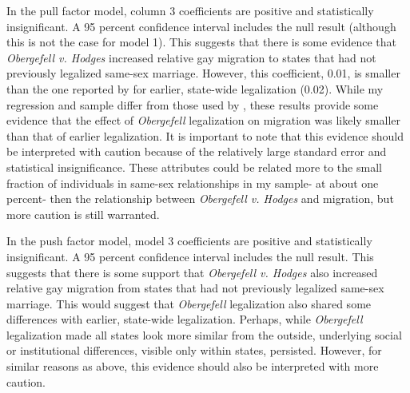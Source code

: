 \documentclass[12pt,letterpaper]{article}
\begin{document}
In the pull factor model, column 3 coefficients are positive and statistically insignificant. A 95 percent confidence interval includes the null result (although this is not the case for model 1). This suggests that there is some evidence that \textit{Obergefell v. Hodges} increased relative gay migration to states that had not previously legalized same-sex marriage. However, this coefficient, 0.01, is smaller than the one reported by \citet{1} for earlier, state-wide legalization (0.02). While my regression and sample differ from those used by \citet{1}, these results provide some evidence that the effect of \textit{Obergefell} legalization on migration was likely smaller than that of earlier legalization. It is important to note that this evidence should be interpreted with caution because of the relatively large standard error and statistical insignificance. These attributes could be related more to the small fraction of individuals in same-sex relationships in my sample- at about one percent- then the relationship between \textit{Obergefell v. Hodges} and migration, but more caution is still warranted.

In the push factor model, model 3 coefficients are positive and statistically insignificant. A 95 percent confidence interval includes the null result. This suggests that there is some support that \textit{Obergefell v. Hodges} also increased relative gay migration from states that had not previously legalized same-sex marriage. This would suggest that \textit{Obergefell} legalization also shared some differences with earlier, state-wide legalization. Perhaps, while \textit{Obergefell} legalization made all states look more similar from the outside, underlying social or institutional differences, visible only within states, persisted. However, for similar reasons as above, this evidence should also be interpreted with more caution.

\FloatBarrier
\end{document}

